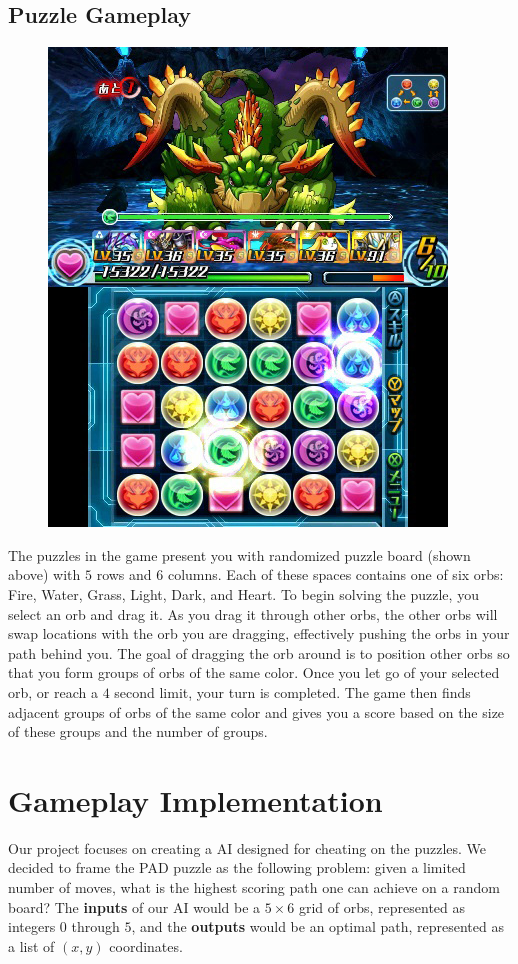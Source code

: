 \documentclass[journal,final,letterpaper,11pt]{IEEEtran}
\begin{document}
\subsection{Puzzle Gameplay}
\begin{figure}[h]
\vspace*{-0.1in}
\centering
\includegraphics[scale=0.5]{pad.jpg}
\end{figure}
\vspace*{-0.1in}
The puzzles in the game present you with randomized puzzle board (shown above) with $5$ rows and $6$ columns. Each of these spaces contains one of six orbs: Fire, Water, Grass, Light, Dark, and Heart. To begin solving the puzzle, you select an orb and drag it. As you drag it through other orbs, the other orbs will swap locations with the orb you are dragging, effectively pushing the orbs in your path behind you. The goal of dragging the orb around is to position other orbs so that you form groups of orbs of the same color. Once you let go of your selected orb, or reach a $4$ second limit, your turn is completed. The game then finds adjacent groups of orbs of the same color and gives you a score based on the size of these groups and the number of groups.

\section{Gameplay Implementation}
Our project focuses on creating a AI designed for cheating on the puzzles. We decided to frame the PAD puzzle as the following problem: given a limited number of moves, what is the highest scoring path one can achieve on a random board? The \textbf{inputs} of our AI would be a $5 \times 6$ grid of orbs, represented as integers $0$ through $5$, and the \textbf{outputs} would be an optimal path, represented as a list of $(x,y)$ coordinates.
\vspace*{-0.1in}
\end{document}
